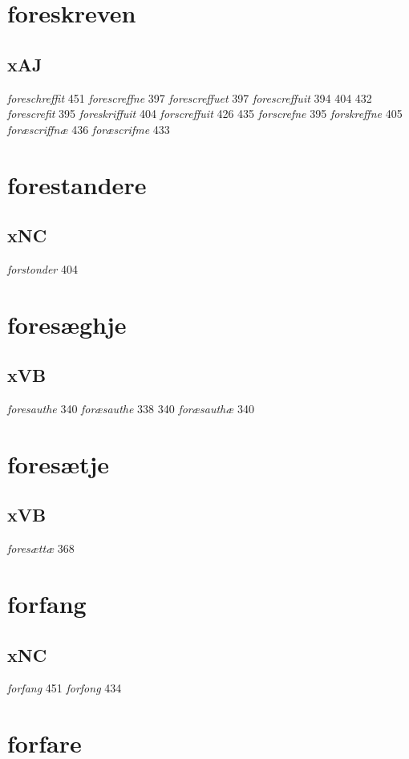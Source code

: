 \documentclass[a4paper,twocolumn]{article}
\begin{document}
\section{foreskreven}
\label{sec:org5dc50f3}
\subsection{xAJ}
\label{sec:org6e56a73}
\emph{foreschreffit} 451 \emph{forescreffne} 397 \emph{forescreffuet} 397 \emph{forescreffuit} 394 404 432 \emph{forescrefit} 395 \emph{foreskriffuit} 404 \emph{forscreffuit} 426 435 \emph{forscrefne} 395 \emph{forskreffne} 405 \emph{foræscriffnæ} 436 \emph{foræscrifme} 433 
\section{forestandere}
\label{sec:org9df8b17}
\subsection{xNC}
\label{sec:orgbda12eb}
\emph{forstonder} 404 
\section{foresæghje}
\label{sec:orgeeb18e0}
\subsection{xVB}
\label{sec:orge8e2a97}
\emph{foresauthe} 340 \emph{foræsauthe} 338 340 \emph{foræsauthæ} 340 
\section{foresætje}
\label{sec:org5d5c816}
\subsection{xVB}
\label{sec:orga46e8b0}
\emph{foresættæ} 368 
\section{forfang}
\label{sec:orge777c04}
\subsection{xNC}
\label{sec:org13ec3cf}
\emph{forfang} 451 \emph{forfong} 434 
\section{forfare}
\label{sec:org3163d3f}
\end{document}
